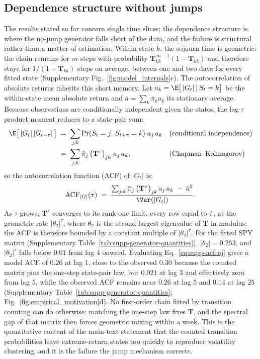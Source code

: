 \subsection{Dependence structure without jumps}
\label{sec:supp-gen-nojump}

The results stated so far concern single time slices; the dependence
structure is where the no-jump generator falls short of the data, and
the failure is structural rather than a matter of estimation. Within
state $k$, the sojourn time is geometric: the chain remains for $m$
steps with probability
$\mathbf{T}_{kk}^{\,m-1} (1 - \mathbf{T}_{kk})$ and therefore stays
for $1/(1 - \mathbf{T}_{kk})$ steps on average, between one and two
days for every fitted state
(Supplementary Fig.~\ref{fig:model_internals}c). The autocorrelation
of absolute returns inherits this short memory. Let $a_k =
\E\big[\,|G_t| \,\big|\, S_t = k\big]$ be the within-state mean
absolute return and $\bar a = \sum_k \bar\pi_k a_k$ its stationary
average. Because observations are conditionally independent given the
states, the lag-$\tau$ product moment reduces to a state-pair sum:
\begin{align}
  \E\big[\,|G_t|\, |G_{t+\tau}|\,\big]
   &\;=\; \sum_{j, k}
     \Pr(S_t = j,\, S_{t+\tau} = k)\; a_j\, a_k
     && \text{(conditional independence)} \notag \\
   &\;=\; \sum_{j, k} \bar\pi_j\,
     \big(\mathbf{T}^\tau\big)_{jk}\; a_j\, a_k,
     && \text{(Chapman--Kolmogorov)}
  \label{eq:supp-acf-nj}
\end{align}
so the autocorrelation function (ACF) of $|G_t|$ is:
\begin{equation}
  \mathrm{ACF}_{|G|}(\tau)
  \;=\; \frac{\sum_{j, k} \bar\pi_j\,
    \big(\mathbf{T}^\tau\big)_{jk}\, a_j\, a_k \;-\; \bar a^2}
    {\Var(|G_t|)}.
  \label{eq:supp-acf-nj-def}
\end{equation}
As $\tau$ grows, $\mathbf{T}^\tau$ converges
to its rank-one limit, every row equal to $\bar\pi$, at the geometric
rate $|\theta_2|^\tau$, where $\theta_2$ is the second-largest
eigenvalue of $\mathbf{T}$ in modulus; the ACF is therefore bounded
by a constant multiple of $|\theta_2|^\tau$. For the fitted SPY
matrix (Supplementary Table~\ref{tab:supp-generator-quantities}), $|\theta_2| = 0.253$, and $|\theta_2|^\tau$ falls below
$0.01$ from lag $4$ onward. Evaluating Eq.~\eqref{eq:supp-acf-nj}
gives a model ACF of $0.26$ at lag $1$, close to the observed $0.30$
because the counted matrix pins the one-step state-pair law, but
$0.021$ at lag $3$ and effectively zero from lag $5$, while the
observed ACF remains near $0.26$ at lag $5$ and $0.14$ at lag $25$
(Supplementary Table~\ref{tab:supp-generator-quantities};
Fig.~\ref{fig:empirical_motivation}d). No first-order chain fitted by transition counting can do otherwise:
matching the one-step law fixes $\mathbf{T}$, and the spectral gap of
that matrix then forces geometric mixing within a week. This is the
quantitative content of the main-text statement that the counted
transition probabilities leave extreme-return states too quickly to
reproduce volatility clustering, and it is the failure the jump
mechanism corrects.

